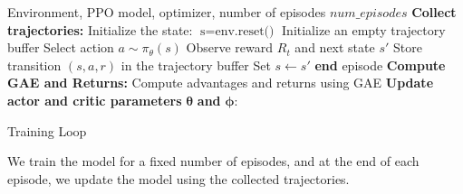 \begin{algorithm}
    \begin{algorithmic}[1]
        \Require Environment, PPO model, optimizer, number of episodes $num\_episodes$
            \State \textbf{Collect trajectories:}
            \State \hspace{1em} Initialize the state: $\text{s} = \text{env.reset()}$
            \State \hspace{1em} Initialize an empty trajectory buffer
                \State \hspace{1em} Select action $a \sim \pi_{\theta}(s)$
                \State \hspace{1em} Observe reward $R_t$ and next state $s'$
                \State \hspace{1em} Store transition $(s, a, r)$ in the trajectory buffer
                \State \hspace{1em} Set $s \leftarrow s'$
                    \State \hspace{1em} \textbf{end} episode
                \EndIf
            \EndFor
            \State \textbf{Compute GAE and Returns:}
            \State \hspace{1em} Compute advantages and returns using GAE
            \State \textbf{Update actor and critic parameters} $\boldsymbol{\theta}$ \textbf{and} $\boldsymbol{\phi}$:
        \EndFor
    \end{algorithmic}
    \caption{Training Loop}
    \label{alg:algorithm}
\end{algorithm}

We train the model for a fixed number of episodes, and at the end of each episode, we update the model using the collected trajectories.

%

